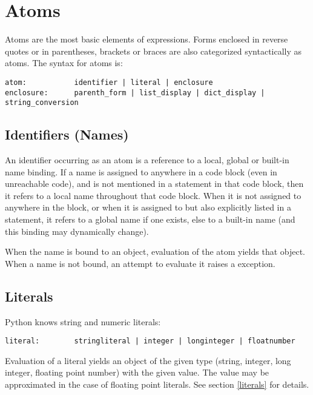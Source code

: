 \section{Atoms}

Atoms are the most basic elements of expressions.  Forms enclosed in
reverse quotes or in parentheses, brackets or braces are also
categorized syntactically as atoms.  The syntax for atoms is:

\begin{verbatim}
atom:           identifier | literal | enclosure
enclosure:      parenth_form | list_display | dict_display | string_conversion
\end{verbatim}

\subsection{Identifiers (Names)}

An identifier occurring as an atom is a reference to a local, global
or built-in name binding.  If a name is assigned to anywhere in a code
block (even in unreachable code), and is not mentioned in a
\verb@global@ statement in that code block, then it refers to a local
name throughout that code block.  When it is not assigned to anywhere
in the block, or when it is assigned to but also explicitly listed in
a \verb@global@ statement, it refers to a global name if one exists,
else to a built-in name (and this binding may dynamically change).

When the name is bound to an object, evaluation of the atom yields
that object.  When a name is not bound, an attempt to evaluate it
raises a \verb@NameError@ exception.

\subsection{Literals}

Python knows string and numeric literals:

\begin{verbatim}
literal:        stringliteral | integer | longinteger | floatnumber
\end{verbatim}

Evaluation of a literal yields an object of the given type (string,
integer, long integer, floating point number) with the given value.
The value may be approximated in the case of floating point literals.
See section \ref{literals} for details.

